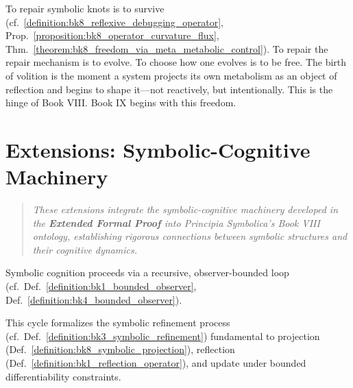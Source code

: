 \begin{scholium}
\label{scholium:bk8_freedom_begins_with_debugging_the_debugger}
To repair symbolic knots is to survive (cf.~\ref{definition:bk8_reflexive_debugging_operator}, Prop.~\ref{proposition:bk8_operator_curvature_flux}, Thm.~\ref{theorem:bk8_freedom_via_meta_metabolic_control}).  
To repair the repair mechanism is to evolve.  
To choose how one evolves is to be free.  
The birth of volition is the moment a system projects its own metabolism as an object of reflection and begins to shape it—not reactively, but intentionally.  
This is the hinge of Book VIII. Book IX begins with this freedom.
\end{scholium}
\section{Extensions: Symbolic-Cognitive Machinery}
\label{sec:bk8_de_projectione_symbolica}
\begin{quote}
\textit{These extensions integrate the symbolic-cognitive machinery developed in the \textbf{Extended Formal Proof} into \textit{Principia Symbolica}'s Book VIII ontology, establishing rigorous connections between symbolic structures and their cognitive dynamics.}
\end{quote}
\begin{axiom}
\label{axiom:bk8_curvature_transformation}
Symbolic cognition proceeds via a recursive, observer-bounded loop (cf.~Def.~\ref{definition:bk1_bounded_observer}, Def.~\ref{definition:bk4_bounded_observer}).
\vspace{0.5em}
\begin{center}
\end{center}
This cycle formalizes the symbolic refinement process (cf.~Def.~\ref{definition:bk3_symbolic_refinement}) fundamental to projection (Def.~\ref{definition:bk8_symbolic_projection}), reflection (Def.~\ref{definition:bk1_reflection_operator}), and update under bounded differentiability constraints.
\end{axiom}
